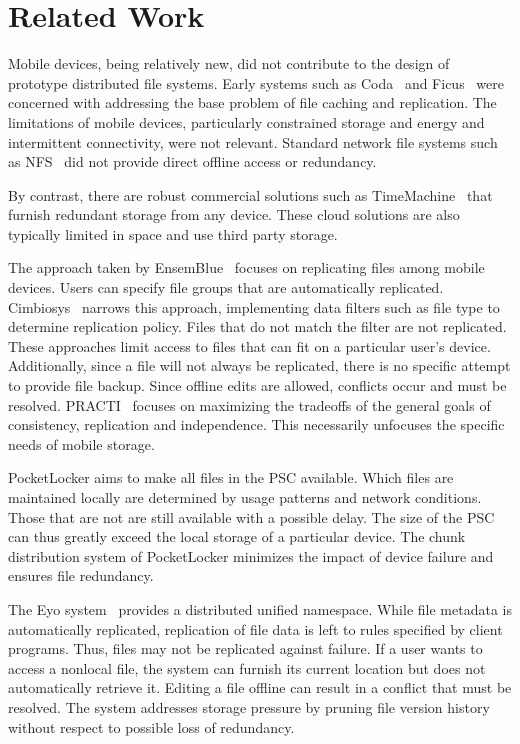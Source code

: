 
\section{Related Work}
\label{sec-related}

Mobile devices, being relatively new, did not contribute to the design of
prototype distributed file systems.  Early systems such as
Coda~\cite{kistler1992disconnected} and Ficus~\cite{guy1990implementation} were
concerned with addressing the base problem of file caching and replication.
The limitations of mobile devices, particularly constrained storage and energy
and intermittent connectivity, were not relevant.  Standard network file
systems such as NFS~\cite{nowicki1989nfs} did not provide direct offline access
or redundancy.

By contrast, there are robust commercial solutions such as
TimeMachine~\cite{timemachine} that furnish redundant storage from any device.
These cloud solutions are also typically limited in space and use third party
storage.

The approach taken by EnsemBlue~\cite{peek2006ensemblue} focuses on replicating
files among mobile devices.  Users can specify file groups that are
automatically replicated.  Cimbiosys~\cite{ramasubramanian2009cimbiosys}
narrows this approach, implementing data filters such as file type to determine
replication policy.  Files that do not match the filter are not replicated.
These approaches limit access to files that can fit on a particular user's
device.  Additionally, since a file will not always be replicated, there is no
specific attempt to provide file backup.  Since offline edits are allowed,
conflicts occur and must be resolved.  PRACTI~\cite{belaramani2006practi}
focuses on maximizing the tradeoffs of the general goals of consistency,
replication and independence.  This necessarily unfocuses the specific needs of
mobile storage.

PocketLocker aims to make all files in the PSC available.  Which files are
maintained locally are determined by usage patterns and network conditions.
Those that are not are still available with a possible delay.  The size of the
PSC can thus greatly exceed the local storage of a particular device.  The
chunk distribution system of PocketLocker minimizes the impact of device
failure and ensures file redundancy.

The Eyo system~\cite{strauss2010device} provides a distributed unified
namespace.  While file metadata is automatically replicated, replication of
file data is left to rules specified by client programs.  Thus, files may not
be replicated against failure.  If a user wants to access a nonlocal file, the
system can furnish its current location but does not automatically retrieve it.
Editing a file offline can result in a conflict that must be resolved.  The
system addresses storage pressure by pruning file version history without
respect to possible loss of redundancy.

